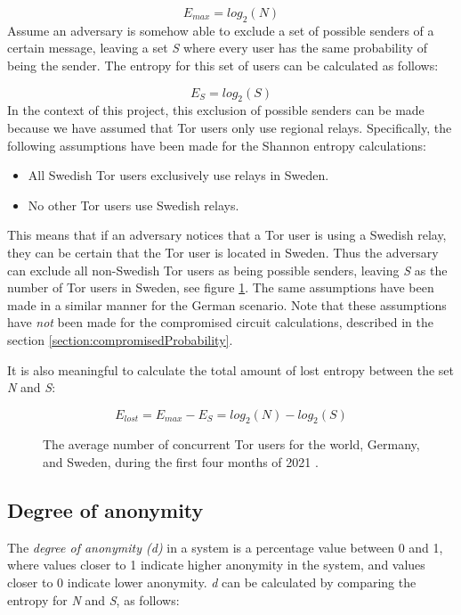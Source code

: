\documentclass{kththesis}
\begin{document}
\[E_{max} = log_{2}(N)\]
Assume an adversary is somehow able to exclude a set of possible senders of a certain message, leaving a set \emph{S} where every user has the same probability of being the sender. The entropy for this set of users can be calculated as follows:

\[E_{S} = log_{2}(S)\]
In the context of this project, this exclusion of possible senders can be made because we have assumed that Tor users only use regional relays. Specifically, the following assumptions have been made for the Shannon entropy calculations:

\begin{itemize}
  \vspace{-0.2cm}\item All Swedish Tor users exclusively use relays in Sweden.
  \vspace{-0.2cm}\item No other Tor users use Swedish relays.
\end{itemize}

This means that if an adversary notices that a Tor user is using a Swedish relay, they can be certain that the Tor user is located in Sweden. Thus the adversary can exclude all non-Swedish Tor users as being possible senders, leaving \emph{S} as the number of Tor users in Sweden, see figure \ref{fig:numberOfTorUsers}. The same assumptions have been made in a similar manner for the German scenario. Note that these assumptions have \emph{not} been made for the compromised circuit calculations, described in the section \ref{section:compromisedProbability}.

It is also meaningful to calculate the total amount of lost entropy between the set \emph{N} and \emph{S}:

\[E_{lost} = E_{max} - E_{S} = log_{2}(N) - log_{2}(S)\]

\begin{figure}[htbp]
  \centering
  
  \caption{The average number of concurrent Tor users for the world, Germany, and Sweden, during the first four months of 2021 \parencite{tormetricsUserStats}.}
  \label{fig:numberOfTorUsers}
\end{figure}

\subsection{Degree of anonymity}
The \emph{degree of anonymity (d)} in a system is a percentage value between 0 and 1, where values closer to 1 indicate higher anonymity in the system, and values closer to 0 indicate lower anonymity. \emph{d} can be calculated by comparing the entropy for \emph{N} and \emph{S}, as follows:
\end{document}

